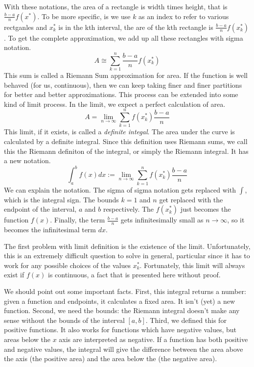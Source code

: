 \documentclass[fleqn]{report}
\begin{document}
With these notations, the area of a rectangle is width times
height, that is $\frac{b-a}{n} f(x^*)$. To be more specific,
is we use $k$ as an index to refer to various rectganles and
$x_k^*$ is in the kth interval, the are of the kth rectangle
is $\frac{b-a}{n} f(x_k^*)$. To get the complete
approximation, we add up all these rectangles with sigma
notation.
\begin{equation*}
A \cong \sum_{k=1}^n \frac{b-a}{n} f(x_k^*)
\end{equation*}
This sum is called a Riemann Sum approximation for area.
If the function is well behaved (for us, continuous), then
we can keep taking finer and finer partitions for better and
better approximations. This process can be extended into some
kind of limit process. In the limit, we expect a perfect
calculation of area.
\begin{equation*}
A = \lim_{n \rightarrow \infty} \sum_{k=1}^n
f(x_k^*) \frac{b-a}{n}
\end{equation*}
This limit, if it exists, is called a \emph{definite integal}.
The area under the curve is calculated by a definite integral.
Since this definition uses Riemann sums, we call this the
Riemann definiton of the integral, or simply the Riemann
integral. It has a new notation.
\begin{equation*}
\int_a^b f(x) dx := \lim_{n \rightarrow \infty} \sum_{k=1}^n
f(x_k^*) \frac{b-a}{n}
\end{equation*}
We can explain the notation. The sigma of sigma
notation gets replaced with $\int$, which is the integral
sign. The bounds $k=1$ and $n$ get replaced with the endpoint
of the interval, $a$ and $b$ respectively. The $f(x^*_k)$
just becomes the function $f(x)$. Finally, the term
$\frac{b-a}{n}$ gets infinitesimally small as $n \rightarrow
\infty$, so it becomes the infinitesimal term $dx$.

The first problem with limit definition is
the existence of the limit. Unfortunately, this is an extremely
difficult question to solve in general, particular since it
has to work for any possible choices of the values $x_k^*$.
Fortunately, this limit will always exist if $f(x)$ is
continuous, a fact that is presented here without proof.

We should point out some important facts. First, this
integral returns a number: given a function and endpoints, it
calculates a fixed area. It isn't (yet) a new function.
Second, we need the bounds: the Riemann integral doesn't make
any sense without the bounds of the interval $[a,b]$. Third,
we defined this for positive functions. It also works for
functions which have negative values, but areas below the $x$ axis
are interpreted as negative. If a function has both positive
and negative values, the integral will give the difference between
the area above the axis (the positive area) and the area below
the (the negative area).
\end{document}
